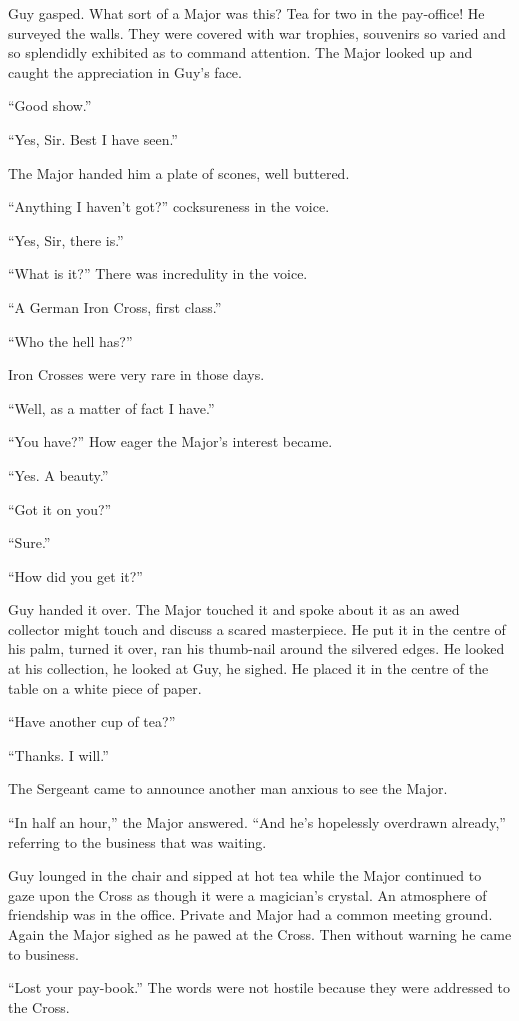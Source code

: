 Guy gasped. What sort of a Major was this? Tea for two in the pay-office! He surveyed the walls. They were covered with war trophies, souvenirs so varied and so splendidly exhibited as to command attention. The Major looked up and caught the appreciation in Guy's face.

``Good show.''

``Yes, Sir. Best I have seen.''

The Major handed him a plate of scones, well buttered.

``Anything I haven't got?'' cocksureness in the voice.

``Yes, Sir, there is.''

``What is it?'' There was incredulity in the voice.

``A German Iron Cross, first class.''

``Who the hell has?''

Iron Crosses were very rare in those days.

``Well, as a matter of fact I have.''

``You have?'' How eager the Major's interest became.

``Yes. A beauty.''

``Got it on you?''

``Sure.''

``How did you get it?''

Guy handed it over. The Major touched it and spoke about it as an awed collector might touch and discuss a scared masterpiece. He put it in the centre of his palm, turned it over, ran his thumb-nail around the silvered edges. He looked at his collection, he looked at Guy, he sighed. He placed it in the centre of the table on a white piece of paper.

``Have another cup of tea?''

``Thanks. I will.''

The Sergeant came to announce another man anxious to see the Major.

``In half an hour,'' the Major answered. ``And he's hopelessly overdrawn already,'' referring to the business that was waiting.

Guy lounged in the chair and sipped at hot tea while the Major continued to gaze upon the Cross as though it were a magician's crystal. An atmosphere of friendship was in the office. Private and Major had a common meeting ground. Again the Major sighed as he pawed at the Cross. Then without warning he came to business.

``Lost your pay-book.'' The words were not hostile because they were addressed to the Cross.

